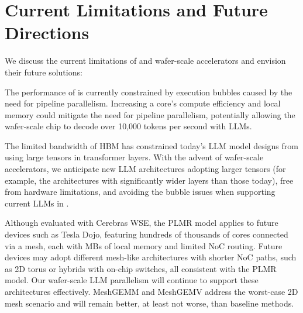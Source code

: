 \vspace{-0.3cm}
\section{Current Limitations and Future Directions}

We discuss the current limitations of \sys and wafer-scale accelerators and envision their future solutions:


 The performance of \sys is currently constrained by execution bubbles caused by the need for pipeline parallelism. Increasing a core's compute efficiency and local memory could mitigate the need for pipeline parallelism, potentially allowing the wafer-scale chip to decode over 10,000 tokens per second with LLMs. 


 The limited bandwidth of HBM has constrained today’s LLM model designs from using large tensors in transformer layers\cite{kaplan2020scaling, brown2020language}. With the advent of wafer-scale accelerators, we anticipate new LLM architectures adopting larger tensors (for example, the architectures with significantly wider layers than those today), free from hardware limitations, and avoiding the bubble issues when supporting current LLMs in \sys.

 Although evaluated with Cerebras WSE, the PLMR model applies to future devices such as Tesla Dojo, featuring hundreds of thousands of cores connected via a mesh, each with MBs of local memory and limited NoC routing. Future devices may adopt different mesh-like architectures with shorter NoC paths, such as 2D torus or hybrids with on-chip switches, all consistent with the PLMR model. Our wafer-scale LLM parallelism will continue to support these architectures effectively. MeshGEMM and MeshGEMV address the worst-case 2D mesh scenario and will remain better, at least not worse, than baseline methods.


